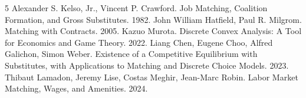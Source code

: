 \begin{thebibliography}{5}
 Alexander S. Kelso, Jr., Vincent P. Crawford. Job Matching, Coalition Formation, and Gross Substitutes. 1982.
 John William Hatfield, Paul R. Milgrom. Matching with Contracts. 2005.
 Kazuo Murota. Discrete Convex Analysis: A Tool for Economics and Game Theory. 2022.
 Liang Chen, Eugene Choo, Alfred Galichon, Simon Weber. Existence of a Competitive Equilibrium with Substitutes, with Applications to Matching and Discrete Choice Models. 2023.
 Thibaut Lamadon, Jeremy Lise, Costas Meghir, Jean-Marc Robin. Labor Market Matching, Wages, and Amenities. 2024.
\end{thebibliography}
